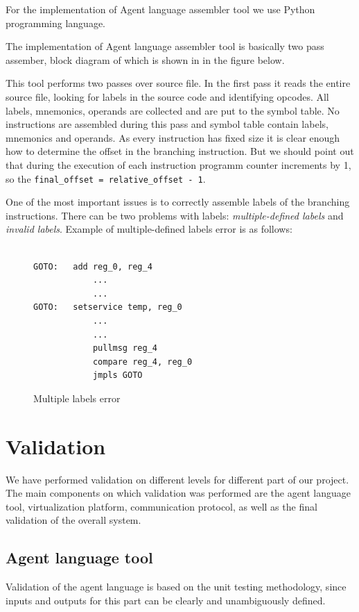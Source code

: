 \documentclass{scrreprt}
\begin{document}
For the implementation of Agent language assembler tool we use Python programming language.


The implementation of Agent language assembler tool is basically two pass assember, block diagram of which is shown in 
in the figure below.

This tool performs two passes over source file. In the first pass it reads the entire source file,
looking for labels in the source code and identifying opcodes.
All labels, mnemonics, operands are collected and are put to the symbol table.
No instructions are assembled during this pass and symbol table contain labels, mnemonics and operands.
As every instruction has fixed size it is clear enough how to determine the offset in the branching instruction.
But we should point out that during the execution of each instruction programm counter increments by 1, so the 
\texttt{final_offset = relative_offset - 1}.


One of the most important issues is to correctly assemble labels of the branching instructions.
There can be two problems with labels: \emph{multiple-defined labels} and \emph{invalid labels}.
Example of multiple-defined labels error is as follows:


\begin{figure}[!htb]
\lstset{tabsize=2}
\begin{lstlisting}[frame=single]
	
GOTO:	add reg_0, reg_4
			...
			...
GOTO:	setservice temp, reg_0
			...
			...
			pullmsg reg_4
			compare reg_4, reg_0
			jmpls GOTO
\end{lstlisting}
\caption{Multiple labels error}
\label{fig:multlabels}
\end{figure}

\chapter{Validation}

We have performed validation on different levels for different part of our project.
The main components on which validation was performed are the agent language tool,
virtualization platform, communication protocol, as well as the final 
validation of the overall system.

\section{Agent language tool}
Validation of the agent language is based on the unit testing methodology,
since inputs and outputs for this part can be clearly and unambiguously defined.
\end{document}
